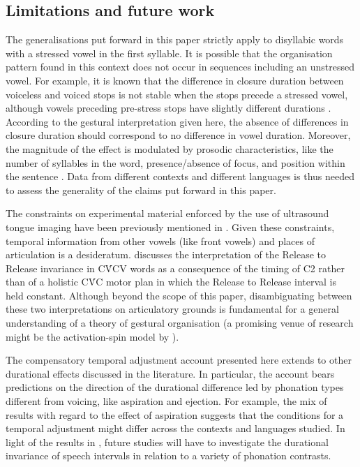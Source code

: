 \documentclass[12pt,]{article}
\begin{document}
\hypertarget{limitations-and-future-work}{%
\subsection{Limitations and future
work}\label{limitations-and-future-work}}

The generalisations put forward in this paper strictly apply to
disyllabic words with a stressed vowel in the first syllable. It is
possible that the organisation pattern found in this context does not
occur in sequences including an unstressed vowel. For example, it is
known that the difference in closure duration between voiceless and
voiced stops is not stable when the stops precede a stressed vowel,
although vowels preceding pre-stress stops have slightly different
durations \citep{davis1989}. According to the gestural interpretation
given here, the absence of differences in closure duration should
correspond to no difference in vowel duration. Moreover, the magnitude
of the effect is modulated by prosodic characteristics, like the number
of syllables in the word, presence/absence of focus, and position within
the sentence \citep{sharf1962, klatt1973, laeufer1992, de-jong2004}.
Data from different contexts and different languages is thus needed to
assess the generality of the claims put forward in this paper.

The constraints on experimental material enforced by the use of
ultrasound tongue imaging have been previously mentioned in
. Given these constraints, temporal information from
other vowels (like front vowels) and places of articulation is a
desideratum.  discusses the interpretation of the
Release to Release invariance in CV́CV words as a consequence of the
timing of C2 rather than of a holistic CV́C motor plan in which the
Release to Release interval is held constant. Although beyond the scope
of this paper, disambiguating between these two interpretations on
articulatory grounds is fundamental for a general understanding of a
theory of gestural organisation (a promising venue of research might be
the activation-spin model by \citealt{tilsen2013}).

The compensatory temporal adjustment account presented here extends to
other durational effects discussed in the literature. In particular, the
account bears predictions on the direction of the durational difference
led by phonation types different from voicing, like aspiration and
ejection. For example, the mix of results with regard to the effect of
aspiration \citep{durvasula2012} suggests that the conditions for a
temporal adjustment might differ across the contexts and languages
studied. In light of the results in \citet{begus2017}, future studies
will have to investigate the durational invariance of speech intervals
in relation to a variety of phonation contrasts.
\end{document}
